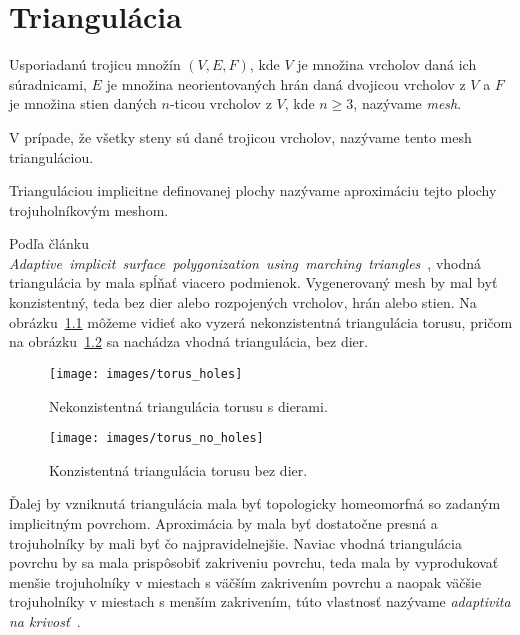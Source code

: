 \chapter{Triangulácia}
\label{kap:triangulation}

Usporiadanú trojicu množín $(V, E, F)$, kde $V$ je množina vrcholov daná ich súradnicami, 
$E$ je množina neorientovaných hrán daná 
dvojicou vrcholov z $V$ a $F$ je množina stien daných $n$-ticou vrcholov z $V$, kde $n \geq 3$, 
nazývame \textit{mesh}.

V prípade, že všetky steny sú dané trojicou vrcholov, nazývame tento mesh trianguláciou.

Trianguláciou implicitne definovanej plochy nazývame aproximáciu tejto plochy trojuholníkovým meshom.

Podľa článku \mbox{\textit{Adaptive implicit surface polygonization using marching triangles}~\cite{akkouche2001adaptive}},
vhodná triangulácia by mala spĺňať viacero podmienok. Vygenerovaný mesh by mal byť konzistentný, 
teda bez dier alebo rozpojených vrcholov, hrán alebo stien. Na \mbox{obrázku \ref{obr:torus_holes}}
môžeme vidieť ako vyzerá nekonzistentná triangulácia torusu, pričom na 
\mbox{obrázku \ref{obr:torus_no_holes}} sa nachádza vhodná triangulácia, bez dier. 

\begin{figure}
    \centerline{\texttt{[image: images/torus\_holes]}}
    \caption[Príklad nekonzistentnej triangulácie]{Nekonzistentná triangulácia torusu s dierami.}
    \label{obr:torus_holes}
\end{figure}

\begin{figure}
    \centerline{\texttt{[image: images/torus\_no\_holes]}}
    \caption[Príklad konzistentnej triangulácie]{Konzistentná triangulácia torusu bez dier.}
    \label{obr:torus_no_holes}
\end{figure}

Ďalej by vzniknutá triangulácia mala byť topologicky homeomorfná 
so zadaným implicitným povrchom. Aproximácia by mala byť dostatočne presná a trojuholníky by mali 
byť čo najpravidelnejšie. Naviac vhodná triangulácia povrchu by sa mala prispôsobiť zakriveniu povrchu,
teda mala by vyprodukovať menšie trojuholníky v miestach s väčším zakrivením povrchu a naopak väčšie
trojuholníky v miestach s menším zakrivením, túto vlastnosť nazývame \textit{adaptivita na krivosť}~\cite{akkouche2001adaptive}.

